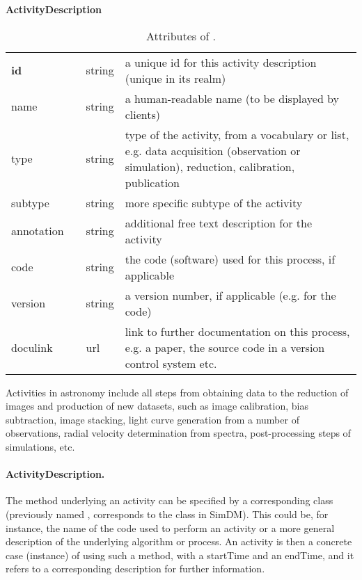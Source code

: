 \begin{table}[ht]
\small
{}\textwidth
\textbf{\normalsize ActivityDescription}\vspace{0.25em}\\
\begin{tabulary}{1.0\textwidth}{@{}p{2.5cm}p{0cm}lL@{}}
\toprule
{} & \head{} &  & \\
\midrule
\textbf{id}  & & string & a unique id for this activity description (unique in its realm)\\
name         & & string & a human-readable name (to be displayed by clients)\\
type         & & string & type of the activity, from a vocabulary or list, e.g. data acquisition (observation or simulation), reduction, calibration, publication\\
subtype      & & string & more specific subtype of the activity\\
annotation  & & string & additional free text description for the activity\\
code         & & string & the code (software) used for this process, if applicable\\
version      & & string & a version number, if applicable (e.g. for the code)\\
doculink     & & url    & link to further documentation on this process, e.g. a 
paper, the source code in a version control system etc.\\
\bottomrule
\end{tabulary}
\caption[Attributes of ]{Attributes of .}
\end{table}


Activities in astronomy include all steps from obtaining data to the reduction
of  images and production of new datasets, such as image calibration, bias
subtraction, image stacking, light curve generation from a number of
observations, radial velocity determination from spectra, post-processing steps
of simulations, etc.

\paragraph{ActivityDescription.}
The method underlying an activity can be specified by a corresponding 
 class (previously named , corresponds 
to the  class in SimDM). This could be, 
for instance, the name of the code used to perform an activity or a more general 
description of the underlying algorithm or process. An activity is then a 
concrete case (instance) of using such a method, with a startTime and an
endTime, and it refers to a corresponding description for further information.

